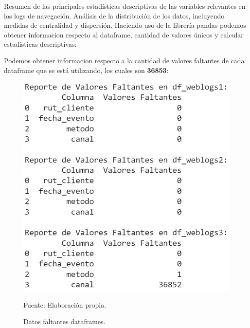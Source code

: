 Resumen de las principales estadísticas descriptivas de las variables relevantes en los logs de navegación.
Análisis de la distribución de los datos, incluyendo medidas de centralidad y dispersión.
Haciendo uso de la librería pandas podemos obtener informacion respecto al dataframe, cantidad de valores únicos y calcular estadísticas descriptivas:

Podemos obtener informacion respecto a la cantidad de valores faltantes de cada dataframe que se está utilizando, los cuales son \textbf{36853}:

\begin{figure}[H]
    \begin{minipage}[t]{0.9\textwidth}
        \caption{Datos faltantes dataframes.}
        \label{descripcion_dataframe}        
    \end{minipage}

    \vspace{10pt}

    \begin{minipage}[b]{0.85\textwidth}
        \centering
        \includegraphics[width=\textwidth]{img/valores faltantes datasets.jpg}        
    \end{minipage}

    \begin{minipage}[t]{0.9\textwidth}
        Fuente: Elaboración propia.
    \end{minipage}
\end{figure}

